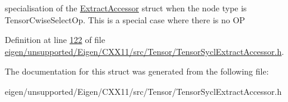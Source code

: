 specialisation of the \hyperlink{struct_eigen_1_1_tensor_sycl_1_1internal_1_1_extract_accessor}{Extract\+Accessor} struct when the node type is Tensor\+Cwise\+Select\+Op. This is a special case where there is no OP 

Definition at line \hyperlink{eigen_2unsupported_2_eigen_2_c_x_x11_2src_2_tensor_2_tensor_sycl_extract_accessor_8h_source_l00122}{122} of file \hyperlink{eigen_2unsupported_2_eigen_2_c_x_x11_2src_2_tensor_2_tensor_sycl_extract_accessor_8h_source}{eigen/unsupported/\+Eigen/\+C\+X\+X11/src/\+Tensor/\+Tensor\+Sycl\+Extract\+Accessor.\+h}.



The documentation for this struct was generated from the following file\+:\begin{DoxyCompactItemize}
\item 
eigen/unsupported/\+Eigen/\+C\+X\+X11/src/\+Tensor/\+Tensor\+Sycl\+Extract\+Accessor.\+h\end{DoxyCompactItemize}
